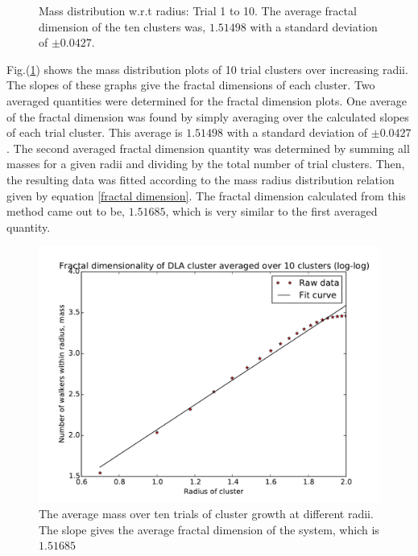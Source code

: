 \documentclass[a4paper,12pt]{article}
\begin{document}
\begin{figure}[H]
\begin{tabular}{@{}cc@{}}
	\end{tabular}
	\caption{Mass distribution w.r.t radius: Trial 1 to 10. The average fractal dimension of the ten clusters was, $1.51498$ with a standard deviation of $\pm 0.0427$.}
	\label{FractalDimension}
\end{figure}

\indent Fig.(\ref{FractalDimension}) shows the mass distribution plots of 10 trial clusters over increasing radii. The slopes of these graphs give the fractal dimensions of each cluster. Two averaged quantities were determined for the fractal dimension plots. 
One average of the fractal dimension was found by simply averaging over the calculated slopes of each trial cluster. This average is $1.51498$ with a standard deviation of $\pm 0.0427$.
The second averaged fractal dimension quantity was determined by summing all masses for a given radii and dividing by the total number of trial clusters. Then, the resulting data was fitted according to the mass radius distribution relation given by equation \ref{fractal dimension}. 
The fractal dimension calculated from this method came out to be, $1.51685$, which is very similar to the first averaged quantity.

\begin{figure}[H]
\begin{center}
\includegraphics[width = \textwidth]{pics/Fractal_dimension_final_avg.pdf}
\caption{The average mass over ten trials of cluster growth at different radii. The slope gives the average fractal dimension of the system, which is $1.51685$}
\label{AvgFractalDimension}
\end{center}
\end{figure}
\end{document}
